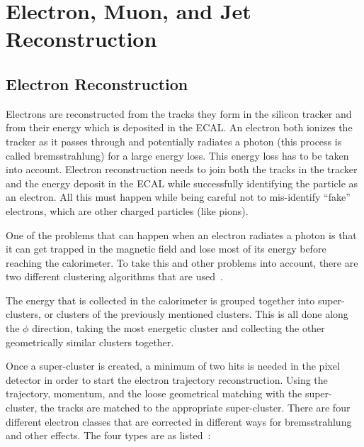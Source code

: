 

\chapter{Electron, Muon, and Jet Reconstruction}

\section{Electron Reconstruction}

Electrons are reconstructed from the tracks they form in the silicon tracker and from their energy which is deposited in the ECAL.  An electron both ionizes the tracker as it passes through and potentially radiates a photon (this process is called bremsstrahlung) for a large energy loss.  This energy loss has to be taken into account.  Electron reconstruction needs to join both the tracks in the tracker and the energy deposit in the ECAL while successfully identifying the particle as an electron.  All this must happen while being careful not to mis-identify ``fake'' electrons, which are other charged particles (like pions).

One of the problems that can happen when an electron radiates a photon is that it can get trapped in the magnetic field and lose most of its energy before reaching the calorimeter.  To take this and other problems into account, there are two different clustering algorithms that are used~\cite{Meschi:687345}. 

The energy that is collected in the calorimeter is grouped together into super-clusters, or clusters of the previously mentioned clusters.  This is all done along the $\phi$ direction, taking the most energetic cluster and collecting the other geometrically similar clusters together.

Once a super-cluster is created, a minimum of two hits is needed in the pixel detector in order to start the electron trajectory reconstruction. Using the trajectory, momentum, and the loose geometrical matching with the super-cluster, the tracks are matched to the appropriate super-cluster. There are four different electron classes that are corrected in different ways for bremsstrahlung and other effects.  The four types are as listed~\cite{Baffioni:934070}:

